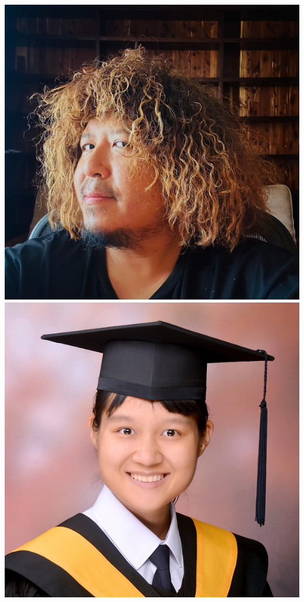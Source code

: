 \documentclass[aspectratio=169]{beamer}
\begin{document}
\begin{frame}
{            \includegraphics[width=0.09\textheight]{figures/students/tze_goh.jpg}%
            \includegraphics[width=0.09\textheight]{figures/students/wei-ning_deng.jpg}%
}
\end{frame}
\end{document}
